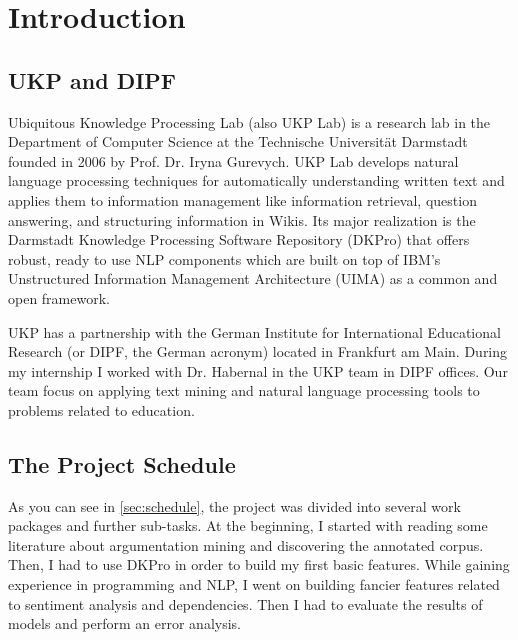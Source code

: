 \chapter*{Introduction}
\section*{UKP and DIPF}
Ubiquitous Knowledge Processing Lab (also UKP Lab) is a research lab in the Department of Computer Science at the Technische Universit\"at Darmstadt founded in 2006 by Prof. Dr. Iryna Gurevych. UKP Lab develops natural language processing techniques for automatically understanding written text and applies them to information management like information retrieval, question answering, and structuring information in Wikis. Its major realization is the Darmstadt Knowledge Processing Software Repository (DKPro) that offers robust, ready to use NLP components which are built on top of IBM’s Unstructured Information Management Architecture (UIMA) as a common and open framework.

UKP has a partnership with the German Institute for International Educational Research (or DIPF, the German acronym) located in Frankfurt am Main. During my internship I worked with Dr. Habernal in the UKP team in DIPF offices. Our team focus on applying text mining and natural language processing tools to problems related to education. 
\section*{The Project Schedule}
As you can see in \cref{sec:schedule}, the project was divided into several work packages and further sub-tasks. At the beginning, I started with reading some literature about argumentation mining and discovering the annotated corpus. Then, I had to use DKPro in order to build my first basic features. While gaining experience in programming and NLP, I went on building fancier features related to sentiment analysis and dependencies. Then I had to evaluate the results of models and perform an error analysis.  